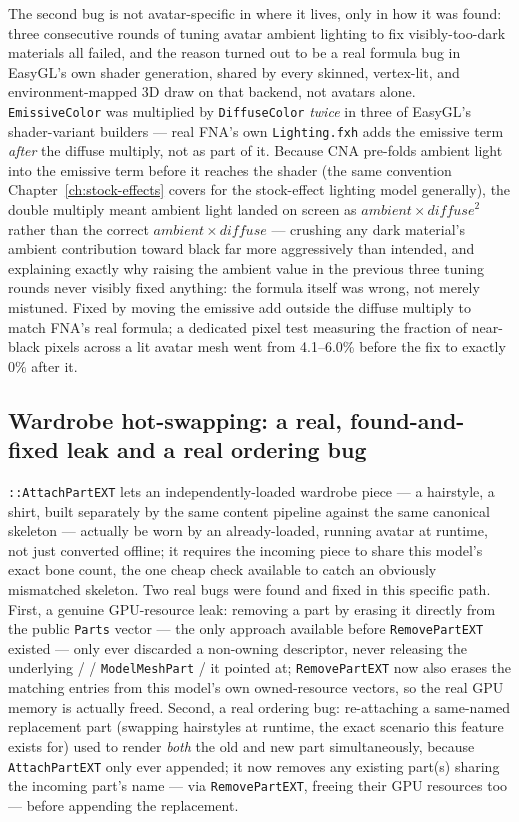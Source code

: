 The second bug is not avatar-specific in where it lives, only in how it was found: three
consecutive rounds of tuning avatar ambient lighting to fix visibly-too-dark materials all
failed, and the reason turned out to be a real formula bug in EasyGL's own shader generation,
shared by every skinned, vertex-lit, and environment-mapped 3D draw on that backend, not
avatars alone. \texttt{EmissiveColor} was multiplied by \texttt{DiffuseColor} \emph{twice} in
three of EasyGL's shader-variant builders --- real FNA's own \texttt{Lighting.fxh} adds the
emissive term \emph{after} the diffuse multiply, not as part of it. Because CNA pre-folds
ambient light into the emissive term before it reaches the shader (the same convention
Chapter~\ref{ch:stock-effects} covers for the stock-effect lighting model generally), the double multiply meant
ambient light landed on screen as $\mathit{ambient} \times \mathit{diffuse}^2$ rather than the
correct $\mathit{ambient} \times \mathit{diffuse}$ --- crushing any dark material's ambient
contribution toward black far more aggressively than intended, and explaining exactly why
raising the ambient value in the previous three tuning rounds never visibly fixed anything: the
formula itself was wrong, not merely mistuned. Fixed by moving the emissive add outside the
diffuse multiply to match FNA's real formula; a dedicated pixel test measuring the fraction of
near-black pixels across a lit avatar mesh went from 4.1--6.0\% before the fix to exactly 0\%
after it.

\subsection{Wardrobe hot-swapping: a real, found-and-fixed leak and a real ordering bug}

\texttt{::AttachPartEXT} lets an independently-loaded wardrobe piece
--- a hairstyle, a shirt, built separately by the same content pipeline against the same
canonical skeleton --- actually be worn by an already-loaded, running avatar at runtime, not
just converted offline; it requires the incoming piece to share this model's exact bone count,
the one cheap check available to catch an obviously mismatched skeleton. Two real bugs were
found and fixed in this specific path. First, a genuine GPU-resource leak: removing a part by
erasing it directly from the public \texttt{Parts} vector --- the only approach available
before \texttt{RemovePartEXT} existed --- only ever discarded a non-owning descriptor,
never releasing the underlying  /  /
\texttt{ModelMeshPart} /  it pointed at; \texttt{RemovePartEXT} now also
erases the matching entries from this model's own owned-resource vectors, so the real GPU
memory is actually freed. Second, a real ordering bug: re-attaching a same-named replacement
part (swapping hairstyles at runtime, the exact scenario this feature exists for) used to
render \emph{both} the old and new part simultaneously, because \texttt{AttachPartEXT} only
ever appended; it now removes any existing part(s) sharing the incoming part's name --- via
\texttt{RemovePartEXT}, freeing their GPU resources too --- before appending the replacement.

